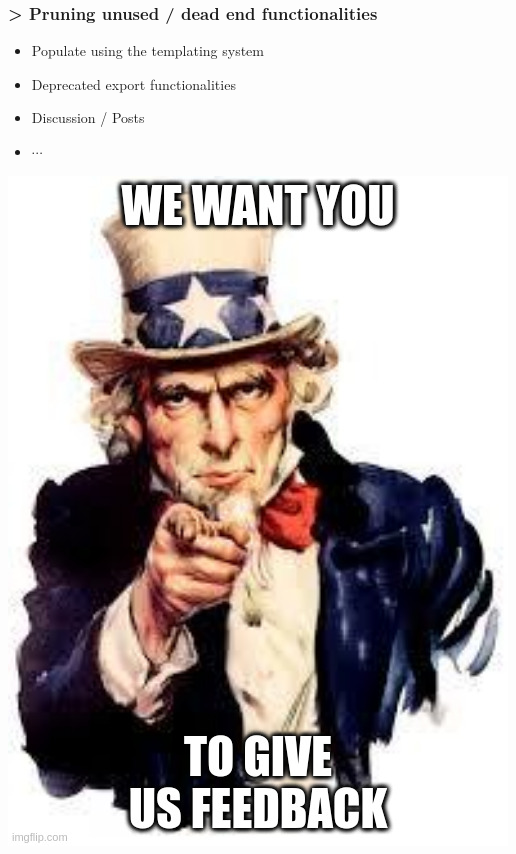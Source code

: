 \begin{frame}
    \frametitle{> Pruning unused / dead end functionalities}
    \begin{minipage}{0.7\textwidth}
        \begin{itemize}
            \item Populate using the templating system
            \item Deprecated export functionalities
            \item Discussion / Posts
            \item $\cdots$
        \end{itemize}
    \end{minipage}%
    \begin{minipage}{0.3\textwidth}
        \begin{center}
            \;\;\includegraphics[width=1\linewidth]{pictures/we-want-you.jpeg}
        \end{center}
    \end{minipage}
    
\end{frame}

